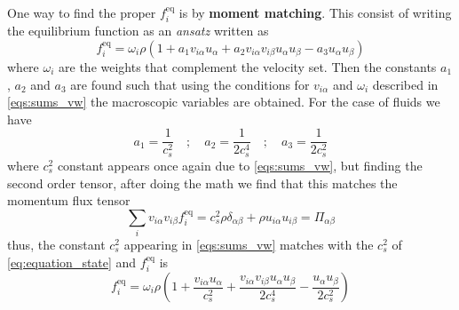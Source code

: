 One way to find the proper $f_i^{\text{eq}}$ is by \textbf{moment matching}. This consist of writing the equilibrium function as an \textit{ansatz} written as
\begin{equation}
    f_i^{\text{eq}} = \omega_i\rho(1 + a_1v_{i\alpha}u_\alpha + a_2v_{i\alpha}v_{i\beta}u_\alpha u_\beta - a_3u_\alpha u_\beta)
\end{equation}
where $\omega_i$ are the weights that complement the velocity set. Then the constants $a_1$, $a_2$ and $a_3$ are found such that using the conditions for $v_{i\alpha}$ and $\omega_i$ described in \ref{eqs:sums_vw} the macroscopic variables are obtained. For the case of fluids we have
\begin{equation}\label{eq:moment_matching_constants}
    a_1 = \frac{1}{c_s^2}\quad;\quad a_2 = \frac{1}{2c_s^4}\quad;\quad a_3 = \frac{1}{2c_s^2}
\end{equation}
where $c_s^2$ constant appears once again due to \ref{eqs:sums_vw}, but finding the second order tensor, after doing the math we find that this matches the momentum flux tensor
\begin{equation}
    \sum_i v_{i\alpha}v_{i\beta}f_i^{\text{eq}} = c_s^2\rho\delta_{\alpha\beta} + \rho u_{i\alpha}u_{i\beta} = \Pi_{\alpha\beta}
\end{equation}
thus, the constant $c_s^2$ appearing in \ref{eqs:sums_vw} matches with the $c_s^2$ of \ref{eq:equation_state} and $f_i^{\text{eq}}$ is
\begin{equation}
    f_i^{\text{eq}} = \omega_i\rho\left(1 + \frac{v_{i\alpha}u_\alpha}{c_s^2} + \frac{v_{i\alpha}v_{i\beta}u_\alpha u_\beta}{2c_s^4} - \frac{u_\alpha u_\beta}{2c_s^2}\right)
\end{equation}

